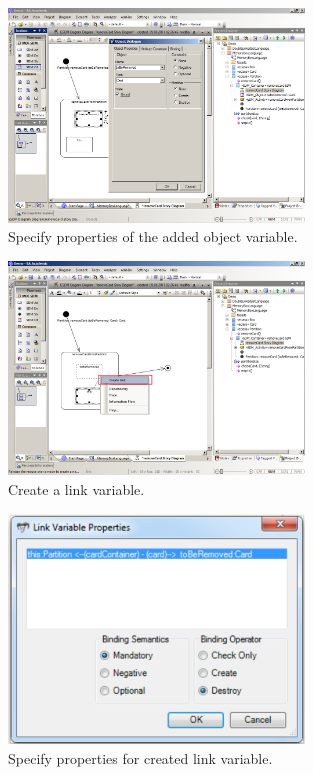 \begin{figure}[htp]
\begin{center}
  \includegraphics[width=0.7\textwidth]{pics/sdmBilder/removeCard/sdm10RAW}
  \caption{Specify properties of the added object variable.}  
  \label{fig:object_variable_properties}
\end{center}
\end{figure}

\begin{figure}[htp]
\begin{center}
  \includegraphics[width=0.7\textwidth]{pics/sdmBilder/removeCard/sdm11RAW}
  \caption{Create a link variable.}  
  \label{fig:link_variable}
\end{center}
\end{figure}

\begin{figure}[htp]
\begin{center}
  \includegraphics[width=0.7\textwidth]{pics/sdmBilder/removeCard/sdm12RAW}
  \caption{Specify properties for created link variable.}  
  \label{fig:link_variable_properties}
\end{center}
\end{figure}

